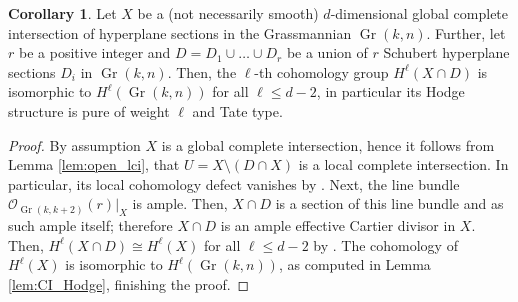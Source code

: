 \documentclass[12pt]{extarticle}
\theoremstyle{definition}
\theoremstyle{theorem}
\newtheorem{corollary}[definition]{Corollary}
\theoremstyle{remark}
\numberwithin{equation}{section}
\newcommand{\PP}{\mathbb{P}}
\DeclareMathOperator{\gr}{Gr}
\newcommand{\grk}{\operatorname{Gr}(k,k+2)}
\begin{document}
\begin{corollary}\label{cor:schubert_divisors_cohomology}
    Let $X$ be a (not necessarily smooth) $d$-dimensional global complete intersection of hyperplane sections in the Grassmannian $\gr(k,n)$. 
    Further, let $r$ be a positive integer and $D=D_1\cup\ldots\cup D_r$ be a union of $r$ Schubert hyperplane sections $D_i$ in $\gr(k,n)$.
    Then, the $\ell$-th cohomology group $H^\ell(X\cap D)$ is isomorphic to $H^\ell(\gr(k,n))$ for all $\ell\leq d-2$, in particular its Hodge structure is pure of weight $\ell$ and Tate type.
\end{corollary}
\begin{proof}
    By assumption $X$ is a global complete intersection, hence it follows from Lemma \ref{lem:open_lci}, that $U=X\setminus (D\cap X)$ is a local complete intersection.
    In particular, its local cohomology defect vanishes by \cite[Example 2.5]{popa_lefschetz}.
    Next, the line bundle $\mathcal{O}_{\grk}(r)\vert_X$ is ample.
    Then, $X\cap D$ is a section of this line bundle and as such ample itself; therefore $X\cap D$ is an ample effective Cartier divisor in $X$.
    Then, $H^{\ell}(X\cap D)\cong H^\ell(X)$ for all $\ell \leq d-2$ by \cite[Theorem B]{popa_lefschetz}.
    The cohomology of $H^\ell(X)$ is isomorphic to $H^\ell(\gr(k,n))$, as computed in Lemma \ref{lem:CI_Hodge}, finishing the proof.
\end{proof}
\end{document}
